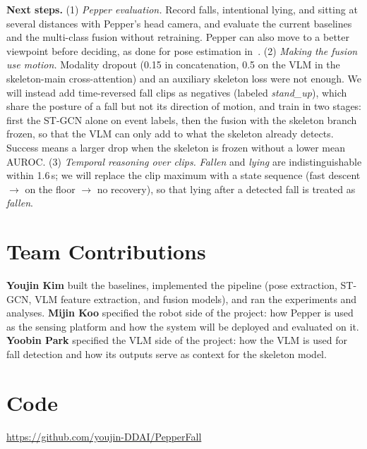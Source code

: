 \textbf{Next steps.}
(1) \emph{Pepper evaluation.} Record falls, intentional lying, and sitting at several distances with Pepper's head camera, and evaluate the current baselines and the multi-class fusion without retraining. Pepper can also move to a better viewpoint before deciding, as done for pose estimation in~\citep{wang2024pepperpose}.
(2) \emph{Making the fusion use motion.} Modality dropout (0.15 in concatenation, 0.5 on the VLM in the skeleton-main cross-attention) and an auxiliary skeleton loss were not enough. We will instead add time-reversed fall clips as negatives (labeled \emph{stand\_up}), which share the posture of a fall but not its direction of motion, and train in two stages: first the ST-GCN alone on event labels, then the fusion with the skeleton branch frozen, so that the VLM can only add to what the skeleton already detects. Success means a larger drop when the skeleton is frozen without a lower mean AUROC.
(3) \emph{Temporal reasoning over clips.} \emph{Fallen} and \emph{lying} are indistinguishable within 1.6\,s; we will replace the clip maximum with a state sequence (fast descent $\to$ on the floor $\to$ no recovery), so that lying after a detected fall is treated as \emph{fallen}.

\section*{Team Contributions}
\textbf{Youjin Kim} built the baselines, implemented the pipeline (pose extraction, ST-GCN, VLM feature extraction, and fusion models), and ran the experiments and analyses.
\textbf{Mijin Koo} specified the robot side of the project: how Pepper is used as the sensing platform and how the system will be deployed and evaluated on it.
\textbf{Yoobin Park} specified the VLM side of the project: how the VLM is used for fall detection and how its outputs serve as context for the skeleton model.

\section*{Code}
\url{https://github.com/youjin-DDAI/PepperFall}

